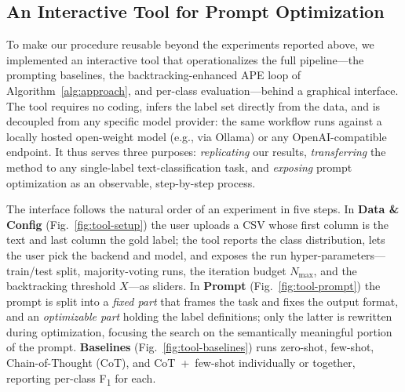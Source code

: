 
\subsection{An Interactive Tool for Prompt Optimization}
\label{sec:tool}

To make our procedure reusable beyond the experiments reported above, we
implemented an interactive tool that operationalizes the full pipeline---the
prompting baselines, the backtracking-enhanced APE loop of
Algorithm~\ref{alg:approach}, and per-class evaluation---behind a graphical
interface. The tool requires no coding, infers the label set directly from
the data, and is decoupled from any specific model provider: the same
workflow runs against a locally hosted open-weight model (e.g., via Ollama)
or any OpenAI-compatible endpoint. It thus serves three purposes:
\emph{replicating} our results, \emph{transferring} the method to any
single-label text-classification task, and \emph{exposing} prompt
optimization as an observable, step-by-step process.

The interface follows the natural order of an experiment in five steps.
In \textbf{Data \& Config} (Fig.~\ref{fig:tool-setup}) the user uploads a CSV
whose first column is the text and last column the gold label; the tool
reports the class distribution, lets the user pick the backend and model,
and exposes the run hyper-parameters---train/test split, majority-voting
runs, the iteration budget $N_{\max}$, and the backtracking threshold
$X$---as sliders. In \textbf{Prompt} (Fig.~\ref{fig:tool-prompt}) the prompt
is split into a \emph{fixed part} that frames the task and fixes the output
format, and an \emph{optimizable part} holding the label definitions; only
the latter is rewritten during optimization, focusing the search on the
semantically meaningful portion of the prompt. \textbf{Baselines}
(Fig.~\ref{fig:tool-baselines}) runs zero-shot, few-shot, Chain-of-Thought
(CoT), and CoT~+~few-shot individually or together, reporting per-class
F\textsubscript{1} for each.

